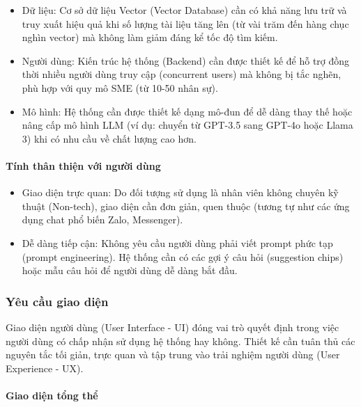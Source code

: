 \begin{itemize}
\item
  Dữ liệu: Cơ sở dữ liệu Vector (Vector Database) cần có khả năng lưu
  trữ và truy xuất hiệu quả khi số lượng tài liệu tăng lên (từ vài trăm
  đến hàng chục nghìn vector) mà không làm giảm đáng kể tốc độ tìm kiếm.
\item
  Người dùng: Kiến trúc hệ thống (Backend) cần được thiết kế để hỗ trợ
  đồng thời nhiều người dùng truy cập (concurrent users) mà không bị tắc
  nghẽn, phù hợp với quy mô SME (từ 10-50 nhân sự).
\item
  Mô hình: Hệ thống cần được thiết kế dạng mô-đun để dễ dàng thay thế
  hoặc nâng cấp mô hình LLM (ví dụ: chuyển từ GPT-3.5 sang GPT-4o hoặc
  Llama 3) khi có nhu cầu về chất lượng cao hơn.
\end{itemize}

\paragraph{Tính thân thiện với người
dùng}\label{tuxednh-thuxe2n-thiux1ec7n-vux1edbi-ngux1b0ux1eddi-duxf9ng}

\begin{itemize}
\item
  Giao diện trực quan: Do đối tượng sử dụng là nhân viên không chuyên kỹ
  thuật (Non-tech), giao diện cần đơn giản, quen thuộc (tương tự như các
  ứng dụng chat phổ biến Zalo, Messenger).
\item
  Dễ dàng tiếp cận: Không yêu cầu người dùng phải viết prompt phức tạp
  (prompt engineering). Hệ thống cần có các gợi ý câu hỏi (suggestion
  chips) hoặc mẫu câu hỏi để người dùng dễ dàng bắt đầu.
\end{itemize}

\subsubsection{Yêu cầu giao diện}\label{yuxeau-cux1ea7u-giao-diux1ec7n}

Giao diện người dùng (User Interface - UI) đóng vai trò quyết định trong
việc người dùng có chấp nhận sử dụng hệ thống hay không. Thiết kế cần
tuân thủ các nguyên tắc tối giản, trực quan và tập trung vào trải nghiệm
người dùng (User Experience - UX).

\paragraph{Giao diện tổng thể}\label{giao-diux1ec7n-tux1ed5ng-thux1ec3}

